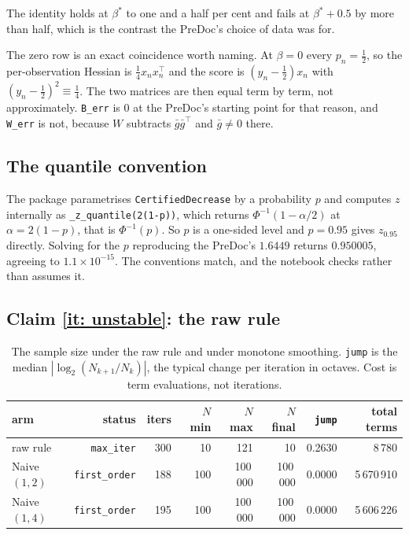 \documentclass[11pt,a4paper]{article}
\providecommand{\abs}[1]{\left \vert #1 \right \vert}
\begin{document}
The identity holds at $\beta^\ast$ to one and a half per cent and fails at
$\beta^\ast + 0.5$ by more than half, which is the contrast the PreDoc's choice of
data was for.

The zero row is an exact coincidence worth naming. At $\beta = 0$ every
$p_n = \tfrac12$, so the per-observation Hessian is $\tfrac14 x_nx_n^{\!\top}$ and
the score is $(y_n - \tfrac12)x_n$ with $(y_n-\tfrac12)^2 \equiv \tfrac14$. The
two matrices are then equal term by term, not approximately. \texttt{B\_err} is
$0$ at the PreDoc's starting point for that reason, and \texttt{W\_err} is not,
because $W$ subtracts $\bar g\bar g^{\!\top}$ and $\bar g \neq 0$ there.

\subsection{The quantile convention}

The package parametrises \texttt{CertifiedDecrease} by a probability $p$ and
computes $z$ internally as \verb|_z_quantile(2(1-p))|, which returns
$\Phi^{-1}(1-\alpha/2)$ at $\alpha = 2(1-p)$, that is $\Phi^{-1}(p)$. So $p$ is a
one-sided level and $p = 0.95$ gives $z_{0.95}$ directly. Solving for the $p$
reproducing the PreDoc's $1.6449$ returns $0.950005$, agreeing to
$1.1\times10^{-15}$. The conventions match, and the notebook checks rather than
assumes it.

\subsection{Claim \ref{it: unstable}: the raw rule}

\begin{table}[H]
  \centering\small
  \caption{The sample size under the raw rule and under monotone smoothing.
    \texttt{jump} is the median $\abs{\log_2(N_{k+1}/N_k)}$, the typical change
    per iteration in octaves. Cost is term evaluations, not iterations.}
  \label{tab: sizes}
  \begin{tabular}{lrrrrrrr}
    \toprule
    arm & status & iters & $N$ min & $N$ max & $N$ final & \texttt{jump} & total terms \\
    \midrule
    raw rule            & \texttt{max\_iter}    & 300 & 10  & 121     & 10      & 0.2630 & 8\,780 \\
    Naive$(1,2)$        & \texttt{first\_order} & 188 & 100 & 100\,000 & 100\,000 & 0.0000 & 5\,670\,910 \\
    Naive$(1,4)$        & \texttt{first\_order} & 195 & 100 & 100\,000 & 100\,000 & 0.0000 & 5\,606\,226 \\
    \bottomrule
  \end{tabular}
\end{table}
\end{document}
